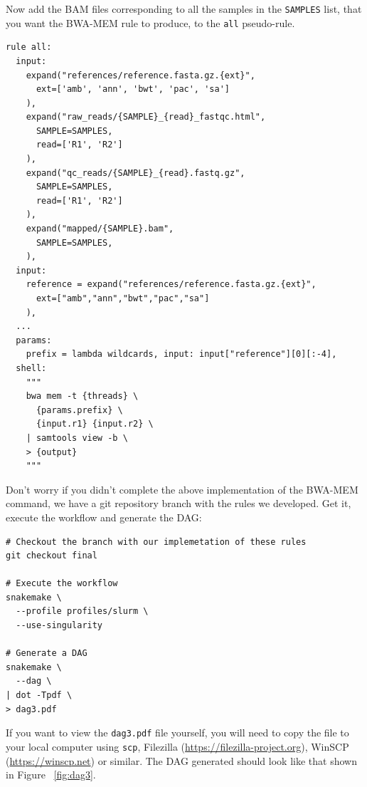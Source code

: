 \begin{questions}

Now add the BAM files corresponding to all the samples in the \texttt{SAMPLES} list, that you want the BWA-MEM rule to produce, to the \texttt{all} pseudo-rule.

\begin{answer}

\begin{lstlisting}
rule all:
  input:
    expand("references/reference.fasta.gz.{ext}",
      ext=['amb', 'ann', 'bwt', 'pac', 'sa']
    ),
    expand("raw_reads/{SAMPLE}_{read}_fastqc.html",
      SAMPLE=SAMPLES,
      read=['R1', 'R2']
    ),
    expand("qc_reads/{SAMPLE}_{read}.fastq.gz",
      SAMPLE=SAMPLES,
      read=['R1', 'R2']
    ),
    expand("mapped/{SAMPLE}.bam",
      SAMPLE=SAMPLES,
    ),
  input:
    reference = expand("references/reference.fasta.gz.{ext}",
      ext=["amb","ann","bwt","pac","sa"]
    ),
  ...
  params:
    prefix = lambda wildcards, input: input["reference"][0][:-4],
  shell:
    """
    bwa mem -t {threads} \
      {params.prefix} \
      {input.r1} {input.r2} \
    | samtools view -b \
    > {output}
    """
\end{lstlisting}

\end{answer}

\end{questions}

Don't worry if you didn't complete the above implementation of the BWA-MEM command, we have a git repository branch with the rules we developed.
Get it, execute the workflow and generate the DAG:

\begin{lstlisting}
# Checkout the branch with our implemetation of these rules
git checkout final

# Execute the workflow
snakemake \
  --profile profiles/slurm \
  --use-singularity

# Generate a DAG
snakemake \
  --dag \
| dot -Tpdf \
> dag3.pdf
\end{lstlisting}

\begin{warning}

If you want to view the \texttt{dag3.pdf} file yourself, you will need to copy the file to your local computer using \texttt{scp}, Filezilla (\url{https://filezilla-project.org}), WinSCP (\url{https://winscp.net}) or similar.
The DAG generated should look like that shown in Figure ~\ref{fig:dag3}.

\end{warning}

